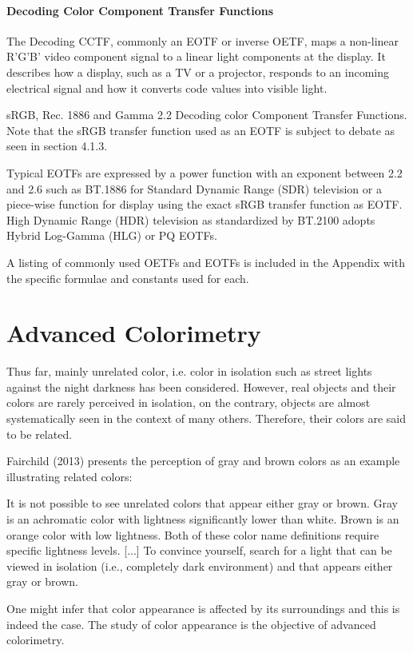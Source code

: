 \paragraph{Decoding Color Component Transfer Functions}

The Decoding CCTF, commonly an EOTF or inverse OETF, maps a non-linear R'G'B' video component signal to a linear light components at the display. It describes how a display, such as a TV or a projector, responds to an incoming electrical signal and how it converts code values into visible light.


sRGB, Rec. 1886 and Gamma 2.2 Decoding color Component Transfer Functions. Note that the sRGB transfer function used as an EOTF is subject to debate as seen in section 4.1.3.

Typical EOTFs are expressed by a power function with an exponent between 2.2 and 2.6 such as BT.1886 for Standard Dynamic Range (SDR) television or a piece-wise function for display using the exact sRGB transfer function as EOTF. High Dynamic Range (HDR) television as standardized by BT.2100 adopts Hybrid Log-Gamma (HLG) or PQ EOTFs.

A listing of commonly used OETFs and EOTFs is included in the Appendix with the specific formulae and constants used for each.

\section{Advanced Colorimetry}

Thus far, mainly unrelated color, i.e. color in isolation such as street lights against the night darkness has been considered. However, real objects and their colors are rarely perceived in isolation, on the contrary, objects are almost systematically seen in the context of many others. Therefore, their colors are said to be related.

Fairchild (2013) presents the perception of gray and brown colors as an example illustrating related colors:

It is not possible to see unrelated colors that appear either gray or brown. Gray is an achromatic color with lightness significantly lower than white. Brown is an orange color with low lightness. Both of these color name definitions require specific lightness levels. [...] To convince yourself, search for a light that can be viewed in isolation (i.e., completely dark environment) and that appears either gray or brown.

One might infer that color appearance is affected by its surroundings and this is indeed the case. The study of color appearance is the objective of advanced colorimetry.


